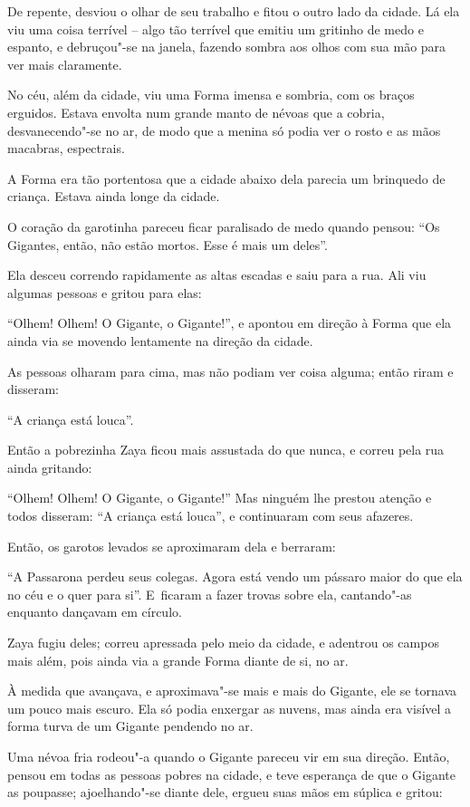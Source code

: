 De repente, desviou o olhar de seu trabalho e fitou o outro lado da
cidade. Lá ela viu uma coisa terrível -- algo tão terrível que emitiu um
gritinho de medo e espanto, e debruçou"-se na janela, fazendo sombra aos
olhos com sua mão para ver mais claramente.

No céu, além da cidade, viu uma Forma imensa e sombria, com os braços
erguidos. Estava envolta num grande manto de névoas que a cobria,
desvanecendo"-se no ar, de modo que a menina só podia ver o rosto e as
mãos macabras, espectrais.

A Forma era tão portentosa que a cidade abaixo dela parecia um brinquedo
de criança. Estava ainda longe da cidade.

O coração da garotinha pareceu ficar paralisado de medo quando pensou:
``Os Gigantes, então, não estão mortos. Esse é mais um deles''.

Ela desceu correndo rapidamente as altas escadas e saiu para a rua. Ali
viu algumas pessoas e gritou para elas:

``Olhem! Olhem! O Gigante, o Gigante!'', e apontou em direção à Forma
que ela ainda via se movendo lentamente na direção da cidade.

As pessoas olharam para cima, mas não podiam ver coisa alguma; então
riram e disseram:

``A criança está louca''.

Então a pobrezinha Zaya ficou mais assustada do que nunca, e correu pela
rua ainda gritando:

``Olhem! Olhem! O Gigante, o Gigante!'' Mas ninguém lhe prestou atenção
e todos disseram: ``A criança está louca'', e continuaram com seus
afazeres.

Então, os garotos levados se aproximaram dela e berraram:

``A Passarona perdeu seus colegas. Agora está vendo um pássaro maior do
que ela no céu e o quer para si''. E~ficaram a fazer trovas sobre ela,
cantando"-as enquanto dançavam em círculo.

Zaya fugiu deles; correu apressada pelo meio da cidade, e adentrou os
campos mais além, pois ainda via a grande Forma diante de si, no ar.

À medida que avançava, e aproximava"-se mais e mais do Gigante, ele se
tornava um pouco mais escuro. Ela só podia enxergar as nuvens, mas ainda
era visível a forma turva de um Gigante pendendo no ar.

Uma névoa fria rodeou"-a quando o Gigante pareceu vir em sua direção.
Então, pensou em todas as pessoas pobres na cidade, e teve esperança de
que o Gigante as poupasse; ajoelhando"-se diante dele, ergueu suas mãos
em súplica e gritou:

